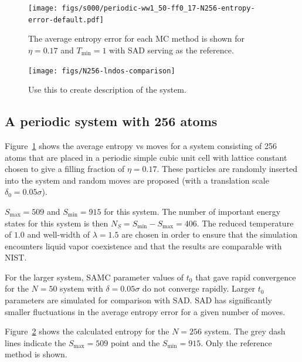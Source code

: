 \documentclass[letterpaper,twocolumn,amsmath,amssymb,pre,aps,10pt]{revtex4-1}
\begin{document}
\begin{figure}
\texttt{[image: figs/s000/periodic-ww1\_50-ff0\_17-N256-entropy-error-default.pdf]}
  \caption{The average entropy error for each MC method is shown for $\eta = 0.17$ and $T_{\min} = 1$ with
  SAD serving as the reference.}\label{fig:n256}
\end{figure}
\begin{figure}
  \texttt{[image: figs/N256-lndos-comparison]}
  \caption{Use this to create description of the system.}\label{fig:n256-lndos-comparison}
\end{figure}


\subsection{A periodic system with 256 atoms}

Figure~\ref{fig:n256} shows the average entropy vs moves for a system
consisting of 256 atoms that are placed in a periodic simple cubic unit
cell with lattice constant chosen to give a filling fraction of $\eta =
0.17$.   These particles are randomly inserted into the system and
random moves are proposed (with a translation scale $\delta_0 =
0.05\sigma$).

{\color{red}
$S_{\max} = 509$ and $S_{\min} = 915$ for this system.  The number of
important energy states for this system is then $N_S = S_{\min} -
S_{\max} = 406$. The reduced temperature of $1.0$ and well-width of $\lambda = 1.5$
are chosen in order to ensure that the simulation encounters liquid vapor coexistence
and that the results are comparable with NIST.
}

For the larger system, SAMC parameter values of $t_0$ that gave rapid
convergence for the $N = 50$ system with $\delta = 0.05\sigma$ do not
converge rapidly.  Larger $t_0$ parameters are simulated for
comparison with SAD.  SAD has significantly smaller fluctuations
in the average entropy error for a given number of moves.

{\color{red}
Figure~\ref{fig:n256-lndos-comparison} shows the calculated entropy for
the $N = 256$ system. The grey dash lines indicate the $S_{\max} = 509$
point and the $S_{\min} = 915$. Only the reference method is shown.
}
\end{document}
